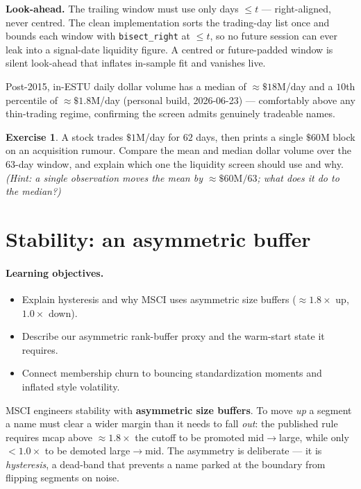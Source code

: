 \documentclass[11pt]{article}
\theoremstyle{definition}
\newtheorem{exercise}{Exercise}[section]
\theoremstyle{plain}
\theoremstyle{remark}
\begin{document}
\begin{pitfall}
\textbf{Look-ahead.} The trailing window must use only days $\le t$ --- right-aligned, never centred. The clean implementation sorts the trading-day list once and bounds each window with \texttt{bisect\_right} at $\le t$, so no future session can ever leak into a signal-date liquidity figure. A centred or future-padded window is silent look-ahead that inflates in-sample fit and vanishes live.
\end{pitfall}

\begin{observed}
Post-2015, in-ESTU daily dollar volume has a median of $\approx\$18$M/day and a $10$th percentile of $\approx\$1.8$M/day (personal build, 2026-06-23) --- comfortably above any thin-trading regime, confirming the screen admits genuinely tradeable names.
\end{observed}

\begin{exercise}
A stock trades $\$1$M/day for $62$ days, then prints a single $\$60$M block on an acquisition rumour. Compare the mean and median dollar volume over the $63$-day window, and explain which one the liquidity screen should use and why. \emph{(Hint: a single observation moves the mean by $\approx \$60\text{M}/63$; what does it do to the median?)}
\end{exercise}

\section{Stability: an asymmetric buffer}\label{sec:stab}

\paragraph{Learning objectives.}
\begin{itemize}[nosep,leftmargin=1.4em]
  \item Explain hysteresis and why MSCI uses asymmetric size buffers ($\approx 1.8\times$ up, $1.0\times$ down).
  \item Describe our asymmetric rank-buffer proxy and the warm-start state it requires.
  \item Connect membership churn to bouncing standardization moments and inflated style volatility.
\end{itemize}

MSCI engineers stability with \textbf{asymmetric size buffers}. To move \emph{up} a segment a name must clear a wider margin than it needs to fall \emph{out}: the published rule requires mcap above $\approx 1.8\times$ the cutoff to be promoted mid$\to$large, while only $< 1.0\times$ to be demoted large$\to$mid. The asymmetry is deliberate --- it is \emph{hysteresis}, a dead-band that prevents a name parked at the boundary from flipping segments on noise.
\end{document}
